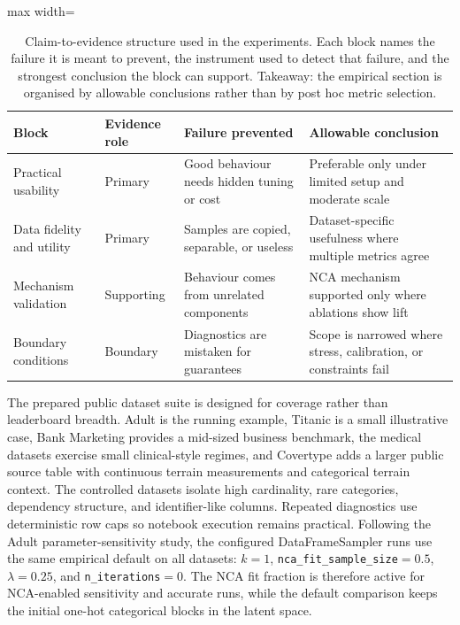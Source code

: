 \begin{table}[t]
\centering
\caption{Claim-to-evidence structure used in the experiments. Each block names
the failure it is meant to prevent, the instrument used to detect that failure,
and the strongest conclusion the block can support. Takeaway: the empirical
section is organised by allowable conclusions rather than by post hoc metric
selection.}
\label{tab:experiment-claim-blocks}
\small
\begin{adjustbox}{max width=\textwidth}
\begin{tabular}{@{}llll@{}}
\toprule
Block & Evidence role & Failure prevented & Allowable conclusion \\
\midrule
Practical usability & Primary & Good behaviour needs hidden tuning or cost & Preferable only under limited setup and moderate scale \\
Data fidelity and utility & Primary & Samples are copied, separable, or useless & Dataset-specific usefulness where multiple metrics agree \\
Mechanism validation & Supporting & Behaviour comes from unrelated components & NCA mechanism supported only where ablations show lift \\
Boundary conditions & Boundary & Diagnostics are mistaken for guarantees & Scope is narrowed where stress, calibration, or constraints fail \\
\bottomrule
\end{tabular}
\end{adjustbox}
\end{table}

The prepared public dataset suite is designed for coverage rather than
leaderboard breadth. Adult is the running example, Titanic is a small
illustrative case, Bank Marketing provides a mid-sized business benchmark, the
medical datasets exercise small clinical-style regimes, and Covertype adds a
larger public source table with continuous terrain measurements and categorical
terrain context. The controlled datasets isolate high cardinality, rare
categories, dependency structure, and identifier-like columns. Repeated
diagnostics use deterministic row caps so notebook execution remains practical.
Following the Adult parameter-sensitivity study, the configured
DataFrameSampler runs use the same empirical default on all datasets:
$k=1$, \texttt{nca\_fit\_sample\_size}$=0.5$, $\lambda=0.25$, and
\texttt{n\_iterations}$=0$. The NCA fit fraction is therefore active for
NCA-enabled sensitivity and accurate runs, while the default comparison keeps
the initial one-hot categorical blocks in the latent space.

